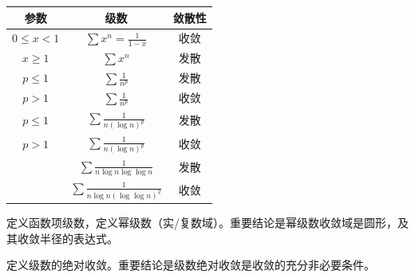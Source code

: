 \documentclass{tufte-book}
\begin{document}
\begin{table}
    \centering
    \begin{tabular}{ccc}
        \toprule
        参数            & 级数                                                   & 敛散性 \\
        \midrule
        \(0\leq x < 1\) & \(\displaystyle \sum x^n = \frac{1}{1-x}\)             & 收敛   \\
        \midrule
        \(x\geq 1\)     & \(\displaystyle \sum x^n \)                            & 发散   \\
        \midrule
        \(p\leq 1\)     & \(\displaystyle \sum\frac{1}{n^p}\)                    & 发散   \\
        \midrule
        \(p>1\)         & \(\displaystyle \sum\frac{1}{n^p}\)                    & 收敛   \\
        \midrule
        \(p\leq 1\)     & \(\displaystyle \sum\frac{1}{n(\log n)^p}\)            & 发散   \\
        \midrule
        \(p>1\)         & \(\displaystyle \sum\frac{1}{n(\log n)^p}\)            & 收敛   \\
        \midrule
        \diagbox{}{}    & \(\displaystyle \sum\frac{1}{n\log n\log \log n}\)     & 发散   \\
        \midrule
        \diagbox{}{}    & \(\displaystyle \sum\frac{1}{n\log n(\log \log n)^2}\) & 收敛   \\
        \bottomrule
    \end{tabular}
\end{table}
\par 定义函数项级数，定义幂级数（实/复数域）。重要结论是幂级数收敛域是圆形，及其收敛半径的表达式。
\par 定义级数的绝对收敛。重要结论是级数绝对收敛是收敛的充分非必要条件。
\end{document}
